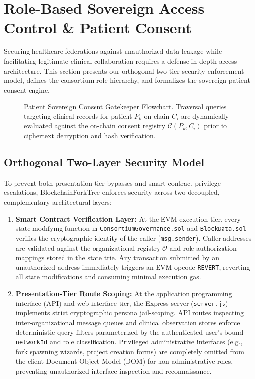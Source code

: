 \section{Role-Based Sovereign Access Control \& Patient Consent}
\label{sec:rbac_consent}

Securing healthcare federations against unauthorized data leakage while facilitating legitimate clinical collaboration requires a defense-in-depth access architecture. This section presents our orthogonal two-tier security enforcement model, defines the consortium role hierarchy, and formalizes the sovereign patient consent engine.

\begin{figure}[t]
\centering

\caption{Patient Sovereign Consent Gatekeeper Flowchart. Traversal queries targeting clinical records for patient $P_k$ on chain $C_i$ are dynamically evaluated against the on-chain consent registry $\mathcal{C}(P_k, C_i)$ prior to ciphertext decryption and hash verification.}
\label{fig:consent_gate}
\end{figure}

\subsection{Orthogonal Two-Layer Security Model}
To prevent both presentation-tier bypasses and smart contract privilege escalations, BlockchainForkTree enforces security across two decoupled, complementary architectural layers:
\begin{enumerate}
    \item \textbf{Smart Contract Verification Layer:} At the EVM execution tier, every state-modifying function in \texttt{ConsortiumGovernance.sol} and \texttt{BlockData.sol} verifies the cryptographic identity of the caller (\texttt{msg.sender}). Caller addresses are validated against the organizational registry $\mathcal{O}$ and role authorization mappings stored in the state trie. Any transaction submitted by an unauthorized address immediately triggers an EVM opcode \texttt{REVERT}, reverting all state modifications and consuming minimal execution gas.
    \item \textbf{Presentation-Tier Route Scoping:} At the application programming interface (API) and web interface tier, the Express server (\texttt{server.js}) implements strict cryptographic persona jail-scoping. API routes inspecting inter-organizational message queues and clinical observation stores enforce deterministic query filters parameterized by the authenticated user's bound \texttt{networkId} and role classification. Privileged administrative interfaces (e.g., fork spawning wizards, project creation forms) are completely omitted from the client Document Object Model (DOM) for non-administrative roles, preventing unauthorized interface inspection and reconnaissance.
\end{enumerate}

